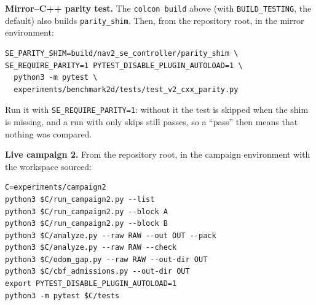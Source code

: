 \documentclass[journal]{IEEEtran}
\begin{document}
\textbf{Mirror--C++ parity test.} The \texttt{colcon build} above (with \texttt{BUILD\_TESTING},
the default) also builds \texttt{parity\_shim}. Then, from the repository root, in the mirror
environment:

{\scriptsize
\begin{verbatim}
SE_PARITY_SHIM=build/nav2_se_controller/parity_shim \
SE_REQUIRE_PARITY=1 PYTEST_DISABLE_PLUGIN_AUTOLOAD=1 \
  python3 -m pytest \
  experiments/benchmark2d/tests/test_v2_cxx_parity.py
\end{verbatim}
}

\noindent Run it with \texttt{SE\_REQUIRE\_PARITY=1}: without it the test is skipped when the
shim is missing, and a run with only skips still passes, so a ``pass'' then means that nothing was compared.

\textbf{Live campaign 2.} From the repository root, in the campaign environment with the
workspace sourced:

{\scriptsize
\begin{verbatim}
C=experiments/campaign2
python3 $C/run_campaign2.py --list
python3 $C/run_campaign2.py --block A
python3 $C/run_campaign2.py --block B
python3 $C/analyze.py --raw RAW --out OUT --pack
python3 $C/analyze.py --raw RAW --check
python3 $C/odom_gap.py --raw RAW --out-dir OUT
python3 $C/cbf_admissions.py --out-dir OUT
export PYTEST_DISABLE_PLUGIN_AUTOLOAD=1
python3 -m pytest $C/tests
\end{verbatim}
}
\end{document}
